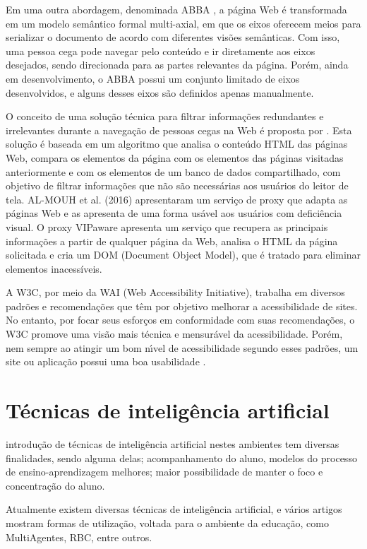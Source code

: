 \documentclass[12pt,journal,compsoc]{IEEEtran}
\begin{document}
Em uma outra abordagem, denominada ABBA \cite{Fayzrakhmanov2010}, a página Web é transformada 
em um modelo semântico formal multi-axial, em que os eixos oferecem meios para serializar o 
documento de acordo com diferentes visões semânticas. Com isso, uma pessoa cega pode navegar 
pelo conteúdo e ir diretamente aos eixos desejados, sendo direcionada para as partes relevantes 
da página. Porém, ainda em desenvolvimento, o ABBA possui um conjunto limitado de eixos desenvolvidos, 
e alguns desses eixos são definidos apenas manualmente.

O conceito de uma solução técnica para filtrar informações redundantes e irrelevantes durante a navegação 
de pessoas cegas na Web é proposta por \cite{Steiner2015}. Esta solução é baseada em um 
algoritmo que analisa o conteúdo HTML das páginas Web, compara os elementos da página com os elementos das 
páginas visitadas anteriormente e com os elementos de um banco de dados compartilhado, com objetivo 
de filtrar informações que não são necessárias aos usuários do leitor de tela. 
AL-MOUH et al. (2016) apresentaram um serviço de proxy que adapta as páginas Web e as apresenta de uma 
forma usável aos usuários com deficiência visual. O proxy VIPaware apresenta um serviço que recupera as 
principais informações a partir de qualquer página da Web, analisa o HTML da página solicitada e cria 
um DOM (Document Object Model), que é tratado para eliminar elementos inacessíveis.

A W3C, por meio da WAI (Web Accessibility Initiative), trabalha em diversos padrões
e recomendações que têm por objetivo melhorar a acessibilidade de sites. No entanto,
por focar seus esforços em conformidade com suas recomendações, o W3C promove uma
visão mais técnica e mensurável da acessibilidade. Porém, nem sempre ao atingir um
bom nı́vel de acessibilidade segundo esses padrões, um site ou aplicação possui uma boa
usabilidade \cite{Petrie2007}.

\section{Técnicas de inteligência artificial}
 introdução de técnicas de inteligência artificial nestes ambientes tem diversas finalidades, 
sendo alguma delas;  acompanhamento do aluno, modelos do processo de ensino-aprendizagem melhores; maior 
possibilidade de manter o foco e concentração do aluno.

Atualmente existem diversas técnicas de inteligência artificial, e vários artigos mostram formas de utilização, 
voltada para o ambiente da educação, como MultiAgentes, RBC, entre outros.
\end{document}
